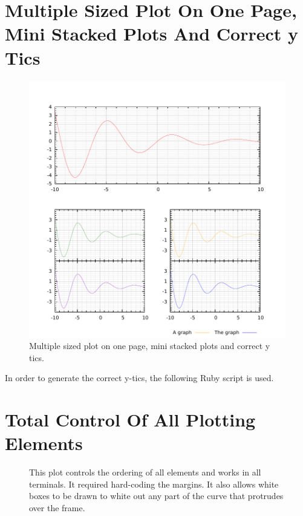 \documentclass[10pt,a4paper,final]{report}
\begin{document}
\section{Multiple Sized Plot On One Page, Mini Stacked Plots And Correct y Tics} \label{sec:MultipleSizedPlots}
\begin{figure}[!hbtp]
\centering
\includegraphics[width=\textwidth]{../CodeJeanLuc/MultipleSizedPlots/MultipleSizedPlots.pdf}
\caption{Multiple sized plot on one page, mini stacked plots and correct y tics.}
\end{figure}

In order to generate the correct y-tics, the following Ruby script is used.


\section{Total Control Of All Plotting Elements}
\begin{figure}[htbp]
\begin{center}
\resizebox{\columnwidth}{!}{}
\caption{This plot controls the ordering of all elements and works in all terminals.  It required hard-coding the margins.  It also allows white boxes to be drawn to white out any part of the curve that protrudes over the frame.}
\label{fig:TotalControl}
\end{center}
\end{figure}

\end{document}
